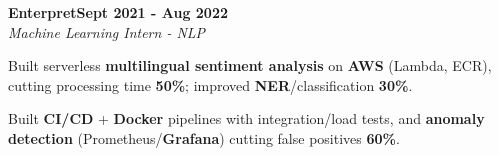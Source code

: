 \documentclass[letterpaper,10pt]{article}
\newcommand{\heading}[2]{
  \hspace{10pt}#1\hfill#2\\
}
\newcommand{\headingBf}[2]{
  \heading{\textbf{#1}}{\textbf{#2}}
}
\newcommand{\headingIt}[2]{
  \heading{\textit{#1}}{\textit{#2}}
}
\newenvironment{resume_list}{
  \vspace{-7pt}
  \begin{itemize}[itemsep=-2px, parsep=1pt, leftmargin=30pt]
}{
  \end{itemize}
}
\begin{document}
\headingBf{Enterpret}{Sept 2021 - Aug 2022}
\headingIt{Machine Learning Intern - NLP}{}
\begin{resume_list}
\item Built serverless \textbf{multilingual sentiment analysis} on \textbf{AWS} (Lambda, ECR), cutting processing time \textbf{50\%}; improved \textbf{NER}/classification \textbf{30\%}.
\item Built \textbf{CI/CD} + \textbf{Docker} pipelines with integration/load tests, and \textbf{anomaly detection} (Prometheus/\textbf{Grafana}) cutting false positives \textbf{60\%}.
\end{resume_list}







\end{document}
